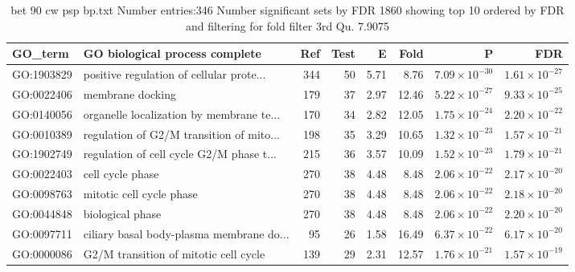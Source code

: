 \begin{table}[ht]
\centering
\begin{tabular}{llrrrrrr}
  \hline
GO\_term & GO biological process complete & Ref & Test & E & Fold & P & FDR \\ 
  \hline
GO:1903829 & positive regulation of cellular prote... & 344 & 50 & 5.71 & 8.76 & $7.09 \times 10^{-30}$ & $1.61 \times 10^{-27}$ \\ 
  GO:0022406 & membrane docking  & 179 & 37 & 2.97 & 12.46 & $5.22 \times 10^{-27}$ & $9.33 \times 10^{-25}$ \\ 
  GO:0140056 & organelle localization by membrane te... & 170 & 34 & 2.82 & 12.05 & $1.75 \times 10^{-24}$ & $2.20 \times 10^{-22}$ \\ 
  GO:0010389 & regulation of G2/M transition of mito... & 198 & 35 & 3.29 & 10.65 & $1.32 \times 10^{-23}$ & $1.57 \times 10^{-21}$ \\ 
  GO:1902749 & regulation of cell cycle G2/M phase t... & 215 & 36 & 3.57 & 10.09 & $1.52 \times 10^{-23}$ & $1.79 \times 10^{-21}$ \\ 
  GO:0022403 & cell cycle phase  & 270 & 38 & 4.48 & 8.48 & $2.06 \times 10^{-22}$ & $2.17 \times 10^{-20}$ \\ 
  GO:0098763 & mitotic cell cycle phase  & 270 & 38 & 4.48 & 8.48 & $2.06 \times 10^{-22}$ & $2.18 \times 10^{-20}$ \\ 
  GO:0044848 & biological phase  & 270 & 38 & 4.48 & 8.48 & $2.06 \times 10^{-22}$ & $2.20 \times 10^{-20}$ \\ 
  GO:0097711 & ciliary basal body-plasma membrane do... & 95 & 26 & 1.58 & 16.49 & $6.37 \times 10^{-22}$ & $6.17 \times 10^{-20}$ \\ 
  GO:0000086 & G2/M transition of mitotic cell cycle  & 139 & 29 & 2.31 & 12.57 & $1.76 \times 10^{-21}$ & $1.57 \times 10^{-19}$ \\ 
  \hline
\end{tabular}
\caption{bet 90 cw psp bp.txt Number entries:346 Number significant sets by FDR 1860 showing top 10 ordered by FDR and filtering for fold filter 3rd Qu. 7.9075} 
\label{tab:bet 90 cw psp bp.txt Number entries:346 Number significant sets by FDR 1860 showing top 10 ordered by FDR and filtering for fold filter 3rd Qu. 7.9075}
\end{table}
